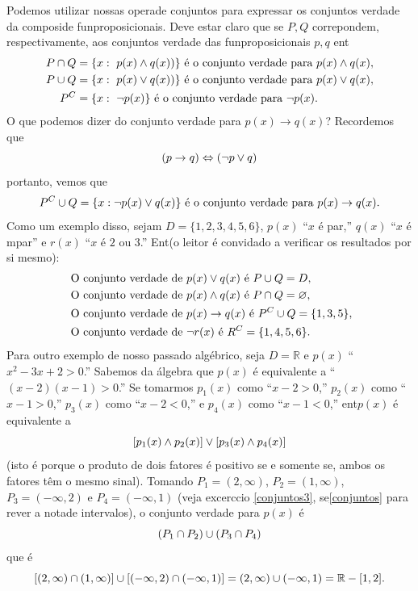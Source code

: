 Podemos utilizar nossas opera\coes de conjuntos para expressar os conjuntos verdade da composi\cao de fun\coes proposicionais. Deve estar claro que se $P,Q$ correpondem, respectivamente, aos conjuntos verdade das fun\coes proposicionais $p,q$ ent\ao
\begin{equation*}
 \begin{aligned}
P\cap Q&=\{x:\textrm{ } p(x)\wedge q(x))\} \textrm{ \'e o conjunto verdade para } p(x)\wedge q(x),\\
P\cup Q&=\{x:\textrm{ } p(x)\vee q(x))\} \textrm{ \'e o conjunto verdade para } p(x)\vee q(x),\\
P^C&=\{x:\textrm{ } \lnot p(x)\} \textrm{ \'e o conjunto verdade para } \lnot p(x).
 \end{aligned}
\end{equation*}
O que podemos dizer do conjunto verdade para $p(x)\to q(x)$? Recordemos que
\[
(p\to q)\Leftrightarrow (\lnot p\vee q)
\]
portanto, vemos que
\[
P^C\cup Q=\{x:\lnot p(x)\vee q(x)\} \textrm{ \'e o conjunto verdade para } p(x)\to q(x).
\]
Como um exemplo disso, sejam $D=\{1,2,3,4,5,6\}$, $p(x)$ ``$x$ \'e par,'' $q(x)$ ``$x$ \'e \ih mpar'' e $r(x)$ ``$x$ \'e $2$ ou $3$.'' Ent\ao (o leitor \'e convidado a verificar os resultados por si mesmo):
\begin{equation*}
 \begin{aligned}
&\textrm{ O conjunto verdade de $p(x)\vee q(x)$ \'e } P\cup Q=D,\\
&\textrm{ O conjunto verdade de $p(x)\wedge q(x)$ \'e } P\cap Q=\varnothing,\\
&\textrm{ O conjunto verdade de $p(x)\to q(x)$ \'e } P^C\cup Q = \{1,3,5\},\\
&\textrm{ O conjunto verdade de $\lnot r(x)$ \'e } R^C=\{1,4,5,6\}.\\
 \end{aligned}
\end{equation*}
Para outro exemplo de nosso passado alg\'ebrico, seja $D=\mathbb{R}$ e $p(x)$ ``$x^2-3x+2>0$.'' Sabemos da \'algebra que $p(x)$ \'e equivalente a ``$(x-2)(x-1)>0$.'' Se tomarmos $p_1(x)$ como ``$x-2>0$,'' $p_2(x)$ como ``$x-1>0$,'' $p_3(x)$ como ``$x-2<0$,'' e $p_4(x)$ como ``$x-1<0$,'' ent\ao $p(x)$ \'e equivalente a 
\[
[p_1(x)\wedge p_2(x)]\vee[p_3(x)\wedge p_4(x)]
\]
(isto \'e porque o produto de dois fatores \'e positivo se e somente se, ambos os fatores t\^em o mesmo sinal). Tomando $P_1=(2,\infty)$, $P_2=(1,\infty)$, $P_3=(-\infty,2)$ e $P_4=(-\infty,1)$ (veja excerc\ih cio \ref{conjuntos3}, se\cao \ref{conjuntos} para rever a nota\cao de intervalos), o conjunto verdade para $p(x)$ \'e
\[
(P_1\cap P_2)\cup(P_3\cap P_4)
\] 
que \'e
\[
[(2,\infty)\cap (1,\infty)]\cup[(-\infty,2)\cap (-\infty,1)]=(2,\infty)\cup(-\infty,1)=\mathbb{R}-[1,2].
\]

